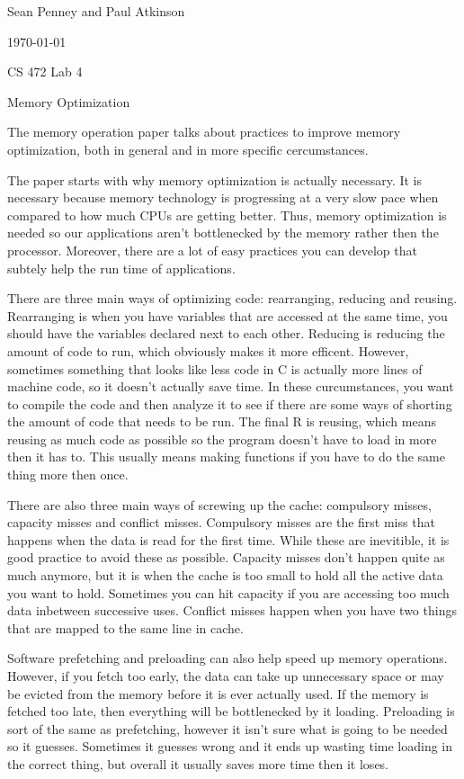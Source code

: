 \documentclass[letterpaper,12pt,titlepage]{article}
\def\name{Sean Penney and Paul Atkinson}
\begin{document}
\hfill \name

\hfill \today

\hfill CS 472 Lab 4


\centerline{\large Memory Optimization}
 
 
The memory operation paper talks about practices to improve memory optimization, both in general and in more specific cercumstances.
\newline
\par
The paper starts with why memory optimization is actually necessary. It is necessary because memory technology is progressing at a very
slow pace when compared to how much CPUs are getting better. Thus, memory optimization is needed so our applications aren't bottlenecked 
by the memory rather then the processor. Moreover, there are a lot of easy practices you can develop that subtely help the run time of 
applications.
\newline
\par
There are three main ways of optimizing code: rearranging, reducing and reusing. Rearranging is when you have variables that are accessed 
at the same time, you should have the variables declared next to each other. Reducing is reducing the amount of code to run, which obviously 
makes it more efficent. However, sometimes something that looks like less code in C is actually more lines of machine code, so it doesn't 
actually save time. In these curcumstances, you want to compile the code and then analyze it to see if there are some ways of shorting 
the amount of code that needs to be run. The final R is reusing, which means reusing as much code as possible so the program doesn't have 
to load in more then it has to. This usually means making functions if you have to do the same thing more then once.
\newline
\par
There are also three main ways of screwing up the cache: compulsory misses, capacity misses and conflict misses. Compulsory misses are 
the first miss that happens when the data is read for the first time. While these are inevitible, it is good practice to avoid these as 
possible. Capacity misses don't happen quite as much anymore, but it is when the cache is too small to hold all the active data you want 
to hold. Sometimes you can hit capacity if you are accessing too much data inbetween successive uses. Conflict misses happen when you have 
two things that are mapped to the same line in cache.
\newline
\par
Software prefetching and preloading can also help speed up memory operations. However, if you fetch too early, the data can take up 
unnecessary space or may be evicted from the memory before it is ever actually used. If the memory is fetched too late, then everything 
will be bottlenecked by it loading. Preloading is sort of the same as prefetching, however it isn't sure what is going to be needed 
so it guesses. Sometimes it guesses wrong and it ends up wasting time loading in the correct thing, but overall it usually saves more 
time then it loses.
\newline
\newline
\newpage
\end{document}
